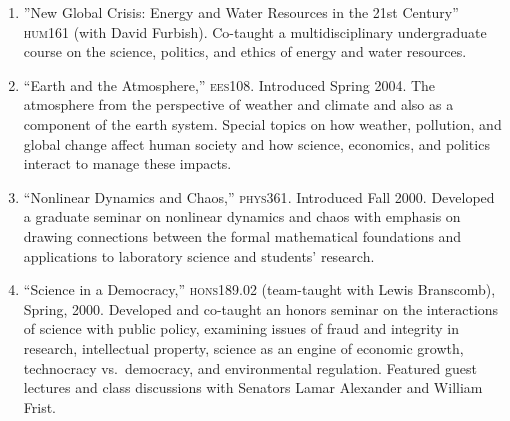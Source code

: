 \begin{enumerate}
\item ''New Global Crisis: Energy and Water Resources in the 21st Century'' \textsc{hum161} (with David Furbish). Co-taught a multidisciplinary undergraduate course on the science, politics, and ethics of energy and water resources.
\item ``Earth and the Atmosphere,'' \textsc{ees108}. Introduced Spring 2004. The atmosphere from the perspective of weather and climate and also as a component of the earth system. Special topics on how weather, pollution, and global change affect human society and how science, economics, and politics interact to manage these impacts.
\item ``Nonlinear Dynamics and Chaos,'' \textsc{phys361}. Introduced Fall 2000. Developed a graduate seminar on nonlinear dynamics and chaos with emphasis on drawing connections between the formal mathematical foundations and applications to laboratory science and students' research.
\item ``Science in a Democracy,'' \textsc{hons189.02} (team-taught with Lewis Branscomb), Spring, 2000. Developed and co-taught an honors seminar on the interactions of science with public policy, examining issues of fraud and integrity in research, intellectual property, science as an engine of economic growth, technocracy vs.\ democracy, and environmental regulation. Featured guest lectures and class discussions with Senators Lamar Alexander and William Frist.
\end{enumerate}